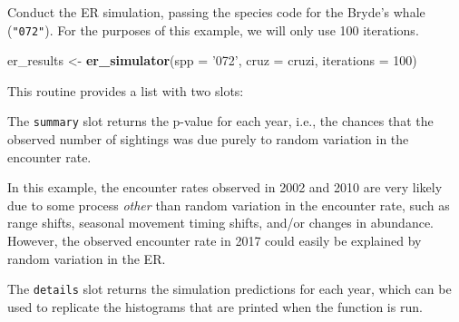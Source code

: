 \documentclass[
]{book}
\newenvironment{Shaded}{\begin{snugshade}}{\end{snugshade}}
\newcommand{\DataTypeTok}[1]{\textcolor[rgb]{0.13,0.29,0.53}{#1}}
\newcommand{\DecValTok}[1]{\textcolor[rgb]{0.00,0.00,0.81}{#1}}
\newcommand{\FloatTok}[1]{\textcolor[rgb]{0.00,0.00,0.81}{#1}}
\newcommand{\KeywordTok}[1]{\textcolor[rgb]{0.13,0.29,0.53}{\textbf{#1}}}
\newcommand{\NormalTok}[1]{#1}
\newcommand{\OperatorTok}[1]{\textcolor[rgb]{0.81,0.36,0.00}{\textbf{#1}}}
\newcommand{\StringTok}[1]{\textcolor[rgb]{0.31,0.60,0.02}{#1}}
\begin{document}
Conduct the ER simulation, passing the species code for the Bryde's whale (\texttt{"072"}). For the purposes of this example, we will only use 100 iterations.

\begin{Shaded}
\begin{Highlighting}[]
\NormalTok{er_results <-}\StringTok{ }
\StringTok{  }\KeywordTok{er_simulator}\NormalTok{(}\DataTypeTok{spp =} \StringTok{'072'}\NormalTok{, }\DataTypeTok{cruz =}\NormalTok{ cruzi, }\DataTypeTok{iterations =} \DecValTok{100}\NormalTok{)}
\end{Highlighting}
\end{Shaded}

This routine provides a list with two slots:

\begin{Shaded}
\end{Shaded}

The \texttt{summary} slot returns the p-value for each year, i.e., the chances that the observed number of sightings was due purely to random variation in the encounter rate.

\begin{Shaded}
\end{Shaded}

In this example, the encounter rates observed in 2002 and 2010 are very likely due to some process \emph{other} than random variation in the encounter rate, such as range shifts, seasonal movement timing shifts, and/or changes in abundance. However, the observed encounter rate in 2017 could easily be explained by random variation in the ER.

The \texttt{details} slot returns the simulation predictions for each year, which can be used to replicate the histograms that are printed when the function is run.
\end{document}

